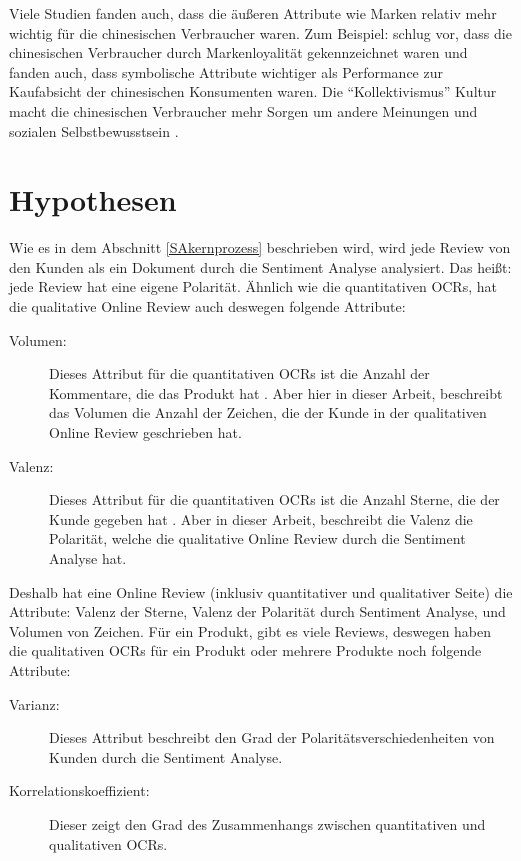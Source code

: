 Viele Studien fanden auch, dass die äußeren Attribute wie Marken relativ mehr wichtig für die chinesischen Verbraucher waren. Zum Beispiel: \citet{chun1998differences} schlug vor, dass die chinesischen Verbraucher durch Markenloyalität gekennzeichnet waren und \citet{zhou2003symbolic} fanden auch, dass symbolische Attribute wichtiger als Performance zur Kaufabsicht der chinesischen Konsumenten waren. Die ``Kollektivismus'' Kultur macht die chinesischen Verbraucher mehr Sorgen um andere Meinungen und sozialen Selbstbewusstsein \citep{rahman2010evaluative}.

\section{Hypothesen} \label{sec:hypothese}
Wie es in dem Abschnitt \ref{SAkernprozess} beschrieben wird, wird jede Review von den Kunden als ein Dokument durch die Sentiment Analyse analysiert. Das heißt: jede Review hat eine eigene Polarität. Ähnlich wie die quantitativen \ac{OCRs}, hat die qualitative Online Review auch deswegen folgende Attribute:
\begin{description}
	\item[Volumen:] Dieses Attribut für die quantitativen \ac{OCRs} ist die Anzahl der Kommentare, die das Produkt hat \citep{Shrihari2012}. Aber hier in dieser Arbeit, beschreibt das Volumen die Anzahl der Zeichen, die der Kunde in der qualitativen Online Review geschrieben hat.
	\item[Valenz:] Dieses Attribut für die quantitativen \ac{OCRs} ist die Anzahl Sterne, die der Kunde gegeben hat \citep{Shrihari2012}. Aber in dieser Arbeit, beschreibt die Valenz die Polarität, welche die qualitative Online Review durch die Sentiment Analyse hat.
\end{description}

Deshalb hat eine Online Review (inklusiv quantitativer und qualitativer Seite) die Attribute: Valenz der Sterne, Valenz der Polarität durch Sentiment Analyse, und Volumen von Zeichen. Für ein Produkt, gibt es viele Reviews, deswegen haben die qualitativen \ac{OCRs} für ein Produkt oder mehrere Produkte noch folgende Attribute:
\begin{description}
	\item[Varianz:] Dieses Attribut beschreibt den Grad der Polaritätsverschiedenheiten von Kunden durch die Sentiment Analyse.
	\item[Korrelationskoeffizient:] Dieser zeigt den Grad des Zusammenhangs zwischen quantitativen und qualitativen \ac{OCRs}.
\end{description}

